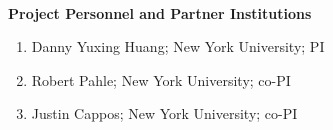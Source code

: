 \begin{center}
    {\large \bf \TITLE } \\
    {\bf Project Personnel and Partner Institutions}
\end{center}


\begin{enumerate}
    \itemsep=-1pt
    \item Danny Yuxing Huang; New York University; PI
    \item Robert Pahle; New York University; co-PI
    \item Justin Cappos; New York University; co-PI
\end{enumerate}
